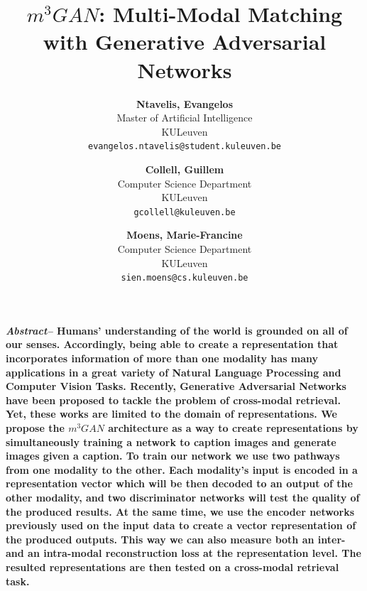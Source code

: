 \documentclass[twocolumn]{article}
\begin{document}
 
 
 
\title{\textbf{\boldmath$m^3GAN$: Multi-Modal Matching with Generative Adversarial Networks}}
\author{\textbf{Ntavelis, Evangelos}\\ %
Master of Artificial Intelligence \\
KULeuven \\
\texttt{evangelos.ntavelis@student.kuleuven.be}
\and
\textbf{Collell, Guillem}
\\
Computer Science Department\\
KULeuven\\
\texttt{gcollell@kuleuven.be}
\and
\textbf{Moens, Marie-Francine}\\
Computer Science Department\\
KULeuven\\
\texttt{sien.moens@cs.kuleuven.be}
\date{}
} %
 
\maketitle

\textbf{
  \textit{Abstract--} Humans' understanding of the world is grounded on all of our senses.
Accordingly, being able to create a representation that incorporates information of more than one modality has many applications in a great variety of Natural Language Processing and Computer Vision Tasks.
  Recently, Generative Adversarial Networks have been proposed to tackle the problem of cross-modal retrieval.
  Yet, these works are limited to the domain of representations.
  We propose the \boldmath$m^3GAN$ architecture as a way to create representations by simultaneously training a network to caption images and generate images given a caption.
  To train our network we use two pathways from one modality to the other.
 Each modality's input is encoded in a representation vector which will be then decoded to an output of the other modality, and two discriminator networks will test the quality of the produced results.
 At the same time, we use the encoder networks previously used on the input data to create a vector representation of the produced outputs.
 This way we can also measure both an inter- and an intra-modal reconstruction loss at the representation level.   
 The resulted representations are then tested on a cross-modal retrieval task.
}
\end{document}

